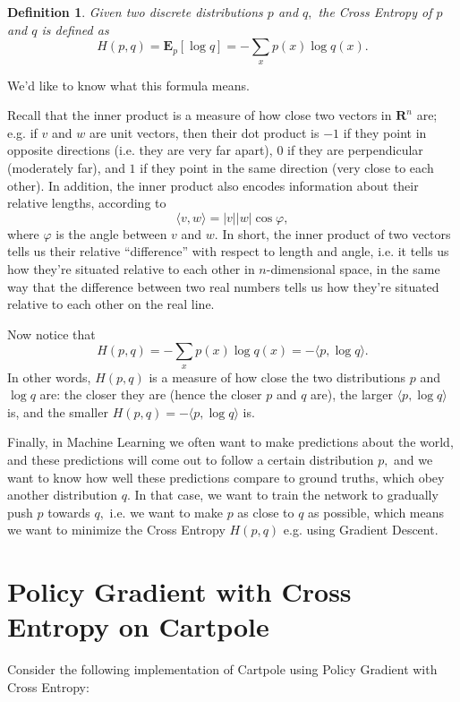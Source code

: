 \documentclass[10pt]{article}
\theoremstyle{plain}
\newtheorem{definition}[theorem]{Definition}
\theoremstyle{definition}
\theoremstyle{remark}
\newcommand{\bE}{\mathbf E}
\newcommand{\bR}{\mathbf R}
\newcommand{\0}{\varnothing}
\newcommand{\f}{\varphi}
\newcommand{\<}{\langle}
\renewcommand{\>}{\rangle}
\begin{document}
\begin{definition}
Given two discrete distributions $ p $ and $ q, $ the Cross Entropy of $ p $ and $ q $ is defined as \[
H(p, q) = \bE_p[\log q] = - \sum_x p(x) \log q(x).
\]
\end{definition}

We'd like to know what this formula means.

Recall that the inner product is a measure of how close two vectors in $ \bR^n $ are; e.g. if $ v $ and $ w $ are unit vectors, then their dot product is $ -1 $ if they point in opposite directions (i.e. they are very far apart), $ 0 $ if they are perpendicular (moderately far), and $ 1 $ if they point in the same direction (very close to each other). In addition, the inner product also encodes information about their relative lengths, according to \[
\< v, w \> = | v | | w | \cos \f,
\]
where $ \f $ is the angle between $ v $ and $ w. $ In short, the inner product of two vectors tells us their relative ``difference'' with respect to length and angle, i.e. it tells us how they're situated relative to each other in $ n $-dimensional space, in the same way that the difference between two real numbers tells us how they're situated relative to each other on the real line.

Now notice that \[
H(p, q) = - \sum_x p(x) \log q(x) = - \< p, \log q \>.
\]
In other words, $ H(p, q) $ is a measure of how close the two distributions $ p $ and $ \log q $ are: the closer they are (hence the closer $ p $ and $ q $ are), the larger $ \< p, \log q \> $ is, and the smaller $ H(p, q) = - \< p, \log q \> $ is.

Finally, in Machine Learning we often want to make predictions about the world, and these predictions will come out to follow a certain distribution $ p, $ and we want to know how well these predictions compare to ground truths, which obey another distribution $ q. $ In that case, we want to train the network to gradually push $ p $ towards $ q, $ i.e. we want to make $ p $ as close to $ q $ as possible, which means we want to minimize the Cross Entropy $ H(p, q) $ e.g. using Gradient Descent.

\break
\section{Policy Gradient with Cross Entropy on Cartpole}

Consider the following implementation of Cartpole using Policy Gradient with Cross Entropy:
\end{document}
